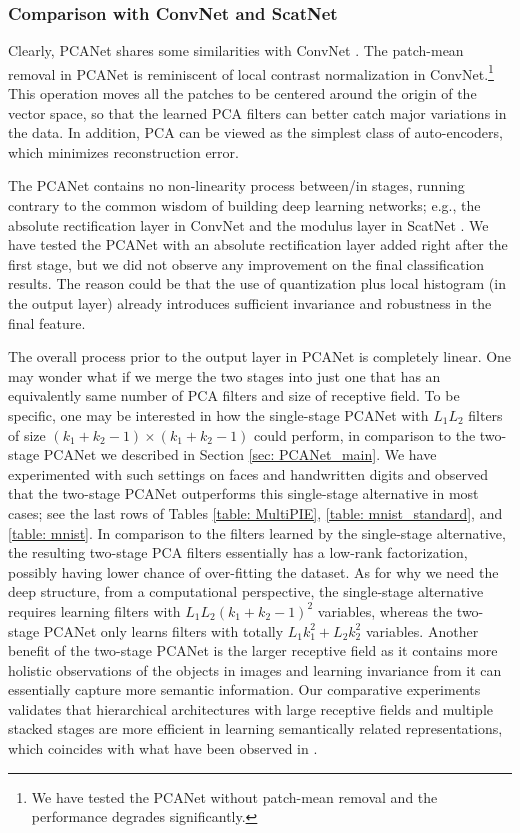 \documentclass[10pt,journal,compsoc]{IEEEtran}
\begin{document}
\subsubsection{Comparison with ConvNet and ScatNet}
Clearly, PCANet shares some similarities with ConvNet \cite{Jarrett2009}. The patch-mean removal in PCANet is reminiscent of local contrast normalization in ConvNet.\footnote{We have tested the PCANet without patch-mean removal and the performance degrades significantly.} This operation moves all the patches to be centered around the origin of the vector space, so that the learned PCA filters can better catch major variations in the data. In addition, PCA can be viewed as the simplest class of auto-encoders, which minimizes reconstruction error.

The PCANet contains no non-linearity process between/in stages, running contrary to the common wisdom of building deep learning networks; e.g., the absolute rectification layer in ConvNet \cite{Jarrett2009} and the modulus layer in ScatNet \cite{Bruna2013,Sifre2013}. We have tested the PCANet with an absolute rectification layer added right after the first stage, but we did not observe any improvement on the final classification results. The reason could be that the use of quantization plus local histogram (in the output layer) already introduces sufficient invariance and robustness in the final feature.


The overall process prior to the output layer in PCANet is completely linear. One may wonder what if we merge the two stages into just one that has an equivalently same number of PCA filters and size of receptive field. To be specific, one may be interested in how the single-stage PCANet with $L_1L_2$ filters of size $(k_1 + k_2 -1) \times (k_1 + k_2 -1)$ could perform, in comparison to the two-stage PCANet we described in Section \ref{sec: PCANet_main}. We have experimented with such settings on faces and handwritten digits and observed that the two-stage PCANet outperforms this single-stage alternative in most cases; see the last rows of Tables \ref{table: MultiPIE}, \ref{table: mnist_standard}, and \ref{table: mnist}. In comparison to the filters learned by the single-stage alternative, the resulting two-stage PCA filters essentially has a low-rank factorization, possibly having lower chance of over-fitting the dataset. As for why we need the deep structure, from a computational perspective, the single-stage alternative requires learning filters with $L_1L_2(k_1 + k_2 -1)^2$ variables, whereas the two-stage PCANet only learns filters with totally $L_1k_1^2 + L_2k_2^2$ variables. Another benefit of the two-stage PCANet is the larger receptive field as it contains more holistic observations of the objects in images and learning invariance from it can essentially capture more semantic information. Our comparative experiments validates that hierarchical architectures with large receptive fields and multiple stacked stages are more efficient in learning semantically related representations, which coincides with what have been observed in \cite{Lee2009}.
\end{document}
